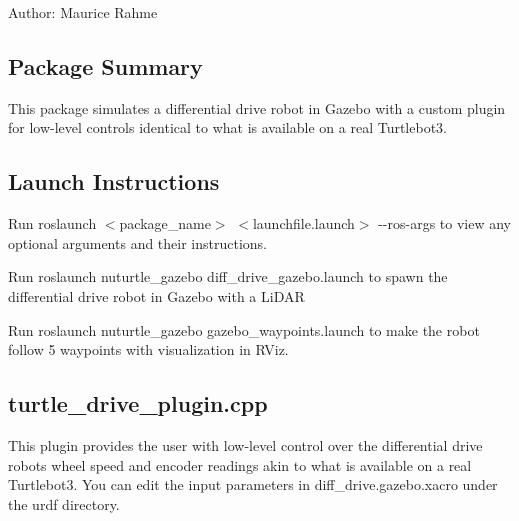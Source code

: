 Author\+: Maurice Rahme

\subsection*{Package Summary}

This package simulates a differential drive robot in Gazebo with a custom plugin for low-\/level controls identical to what is available on a real Turtlebot3.



\subsection*{Launch Instructions}

Run {\ttfamily roslaunch $<$package\+\_\+name$>$ $<$launchfile.\+launch$>$ -\/-\/ros-\/args} to view any optional arguments and their instructions.

Run {\ttfamily roslaunch nuturtle\+\_\+gazebo diff\+\_\+drive\+\_\+gazebo.\+launch} to spawn the differential drive robot in Gazebo with a Li\+D\+AR

Run {\ttfamily roslaunch nuturtle\+\_\+gazebo gazebo\+\_\+waypoints.\+launch} to make the robot follow 5 waypoints with visualization in R\+Viz.

\subsection*{turtle\+\_\+drive\+\_\+plugin.\+cpp}

This plugin provides the user with low-\/level control over the differential drive robot\textquotesingle{}s wheel speed and encoder readings akin to what is available on a real Turtlebot3. You can edit the input parameters in {\ttfamily diff\+\_\+drive.\+gazebo.\+xacro} under the {\ttfamily urdf} directory. 